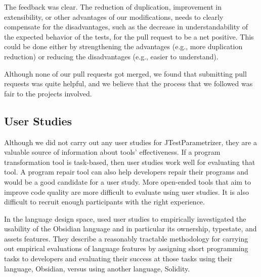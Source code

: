 The feedback was clear. The reduction of duplication, improvement in extensibility, or other advantages of our modifications, needs to clearly compensate for the disadvantages, such as the decrease in understandability of the expected behavior of the tests, for the pull request to be a net positive. This could be done either by strengthening the advantages (e.g., more duplication reduction) or reducing the disadvantages (e.g., easier to understand).

Although none of our pull requests got merged, we found that submitting pull requests was quite helpful, and we believe that the process that we followed was fair to the projects involved.



\subsection{User Studies}
Although we did not carry out any user studies for JTestParametrizer, they
are a valuable source of information about tools' effectiveness. 
If a program transformation tool is task-based, then user studies work
well for evaluating that tool. A program repair tool can also help developers
repair their programs and would be a good candidate for a user study.
More open-ended tools that aim to improve code quality are more difficult
to evaluate using user studies. It is also
difficult to recruit enough participants with the right experience.

In the language design space,  used user studies to empirically
investigated the usability of the Obsidian language and in particular
its ownership, typestate, and assets features. They describe a
reasonably tractable methodology for carrying out empirical
evaluations of language features by assigning short programming tasks
to developers and evaluating their success at those tasks using their
language, Obsidian, versus using another language, Solidity.

